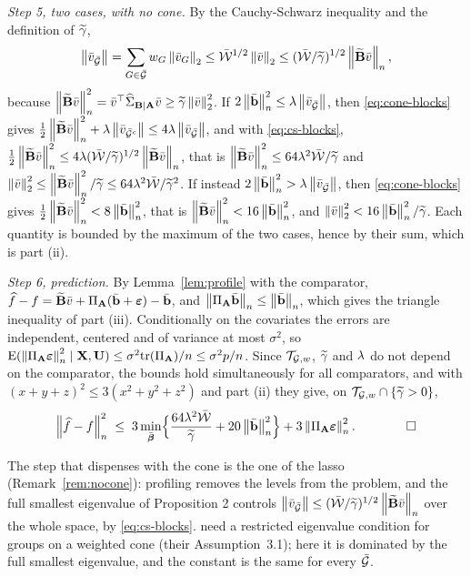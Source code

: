 \emph{Step 5, two cases, with no cone.} By the Cauchy-Schwarz inequality and
the definition of $\gtil$,
\begin{equation}
  \label{eq:cs-blocks}
  \norm{\vbar_{\Gbar}} = \sum_{G\in\Gbar}w_{G}\norm{\vbar_{G}}_{2}
  \le \bar\Wcal^{1/2}\norm{\vbar}_{2}
  \le (\bar\Wcal/\gtil)^{1/2}\normn{\Btil\vbar},
\end{equation}
because $\normn{\Btil\vbar}^{2} = \vbar\T\GBA\vbar \ge \gtil\norm{\vbar}_{2}^{2}$.
If $2\normn{\bbar}^{2} \le \pen\norm{\vbar_{\Gbar}}$, then
\eqref{eq:cone-blocks} gives $\tfrac12\normn{\Btil\vbar}^{2} +
\pen\norm{\vbar_{\Gbar^{c}}} \le 4\pen\norm{\vbar_{\Gbar}}$, and with
\eqref{eq:cs-blocks}, $\tfrac12\normn{\Btil\vbar}^{2} \le
4\pen(\bar\Wcal/\gtil)^{1/2}\normn{\Btil\vbar}$, that is
$\normn{\Btil\vbar}^{2} \le 64\pen^{2}\bar\Wcal/\gtil$ and
$\norm{\vbar}_{2}^{2} \le \normn{\Btil\vbar}^{2}/\gtil \le
64\pen^{2}\bar\Wcal/\gtil^{2}$. If instead
$2\normn{\bbar}^{2} > \pen\norm{\vbar_{\Gbar}}$, then \eqref{eq:cone-blocks}
gives $\tfrac12\normn{\Btil\vbar}^{2} < 8\normn{\bbar}^{2}$, that is
$\normn{\Btil\vbar}^{2} < 16\normn{\bbar}^{2}$, and
$\norm{\vbar}_{2}^{2} < 16\normn{\bbar}^{2}/\gtil$. Each quantity is bounded by
the maximum of the two cases, hence by their sum, which is part (ii).

\emph{Step 6, prediction.} By Lemma~\ref{lem:profile} with the comparator,
$\widehat{f}-f = \Btil\vbar + \PA(\bbar+\bveps) - \bbar$, and
$\normn{\PA\bbar} \le \normn{\bbar}$, which gives the triangle inequality of
part (iii). Conditionally on the covariates the errors are independent,
centered and of variance at most $\sigma^{2}$, so
$\E(\normn{\PA\bveps}^{2}\mid\bX,\bU) \le \sigma^{2}\mathrm{tr}(\PA)/n \le
\sigma^{2}p/n$. Since $\Tw$, $\gtil$ and $\pen$ do not depend on the
comparator, the bounds hold simultaneously for all comparators, and with
$(x+y+z)^{2} \le 3(x^{2}+y^{2}+z^{2})$ and part (ii) they give, on
$\Tw\cap\{\gtil > 0\}$,
\begin{equation}
  \label{eq:oracle-min-blocks}
  \normn{\widehat{f}-f}^{2} \;\le\;
  3\min_{\bar\bbeta}\Bigl\{\frac{64\pen^{2}\bar\Wcal}{\gtil}
  + 20\normn{\bbar}^{2}\Bigr\} + 3\normn{\PA\bveps}^{2} . \qquad\qed
\end{equation}

\begin{remark}
\label{rem:nocone-blocks}
The step that dispenses with the cone is the one of the lasso
(Remark~\ref{rem:nocone}): profiling removes the levels from the problem, and
the full smallest eigenvalue of Proposition 2 controls
$\norm{\vbar_{\Gbar}} \le (\bar\Wcal/\gtil)^{1/2}\normn{\Btil\vbar}$ over the
whole space, by \eqref{eq:cs-blocks}.
\citet{Lounici-Pontil-vandeGeer-Tsybakov-2011} need a restricted eigenvalue
condition for groups on a weighted cone (their Assumption~3.1); here it is
dominated by the full smallest eigenvalue, and the constant is the same for
every $\Gbar$.
\end{remark}

